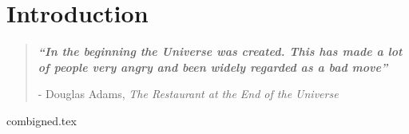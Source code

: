 

\chapter{ Introduction }


\blankpage
\restoregeometry
\vspace*{0.15\paperheight}


\begin{center}
\begin{quotation}
  \large{\emph{\textbf{``In the beginning the Universe was created.
This has made a lot of people very angry and been widely regarded as a bad move''} }  }  \\
  \begin{flushright}
  - Douglas Adams, \textit{The Restaurant at the End of the Universe}
  \end{flushright}
 \end{quotation}
\end{center}
\doublespacing
\newpage

% 










{combigned.tex} 

\chapterbib






